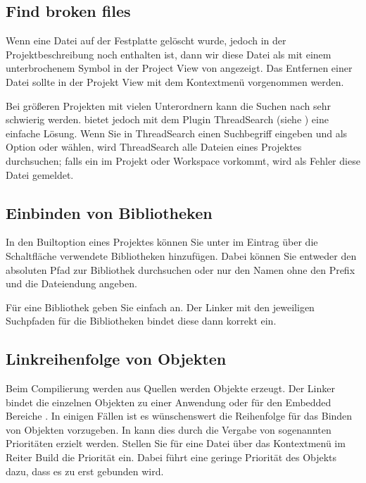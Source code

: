 \subsection{Find broken files}

Wenn eine Datei auf der Festplatte gelöscht wurde, jedoch in der Projektbeschreibung  noch enthalten ist, dann wir diese Datei als  mit einem unterbrochenem Symbol in der Project View von \codeblocks angezeigt. Das Entfernen einer Datei sollte in der Projekt View mit dem Kontextmenü  vorgenommen werden.

Bei größeren Projekten mit vielen Unterordnern kann die Suchen nach  sehr schwierig werden. \codeblocks bietet jedoch mit dem Plugin ThreadSearch (siehe ) eine einfache Lösung. Wenn Sie in ThreadSearch einen Suchbegriff eingeben und als Option  oder  wählen, wird ThreadSearch alle Dateien eines Projektes durchsuchen; falls ein  im Projekt oder Workspace vorkommt, wird als Fehler diese Datei gemeldet.

\subsection{Einbinden von Bibliotheken}

In den Builtoption eines Projektes können Sie unter  im Eintrag  über die Schaltfläche  verwendete Bibliotheken hinzufügen. Dabei können Sie entweder den absoluten Pfad zur Bibliothek durchsuchen oder nur den Namen ohne den Prefix  und die Dateiendung angeben.


Für eine Bibliothek  geben Sie einfach  an. Der Linker mit den jeweiligen Suchpfaden für die Bibliotheken bindet diese dann korrekt ein.


\subsection{Linkreihenfolge von Objekten}

Beim Compilierung werden aus Quellen  werden Objekte  erzeugt. Der Linker bindet die einzelnen Objekten zu einer Anwendung  oder für den Embedded Bereiche . In einigen Fällen ist es wünschenswert die Reihenfolge für das Binden von Objekten vorzugeben. In \codeblocks kann dies durch die Vergabe von sogenannten Prioritäten erzielt werden. Stellen Sie für eine Datei über das Kontextmenü  im Reiter Build die Priorität ein. Dabei führt eine geringe Priorität des Objekts dazu, dass es zu erst gebunden wird.

